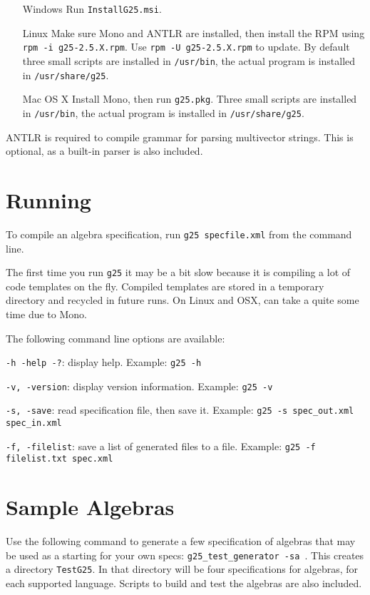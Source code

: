 \documentclass[10pt, a4paper]{article}
\begin{document}
\begin{itemize}
\item[Windows] Run {\tt InstallG25.msi}.
\item[Linux] Make sure Mono and ANTLR are installed, then install the RPM using 
{\tt rpm -i g25-2.5.X.rpm}. Use {\tt rpm -U g25-2.5.X.rpm} to update.
By default three small scripts are installed in {\tt /usr/bin}, the actual program is installed in {\tt /usr/share/g25}.
\item[Mac OS X] Install Mono, then run {\tt g25.pkg}. Three small scripts are installed in {\tt /usr/bin}, the actual 
program is installed in {\tt /usr/share/g25}.
\end{itemize}

ANTLR is required to compile grammar for parsing multivector strings.
This is optional, as a built-in parser is also included.

\section{Running}

To compile an algebra specification, run {\tt g25 specfile.xml} from the command line.
	
The first time you run {\tt g25} it may be a bit slow because it is compiling
a lot of code templates on the fly. Compiled templates are stored in a temporary 
directory and recycled in future runs.
On Linux and OSX, can take a quite some time due to Mono.

	
The following command line options are available:

{\tt -h -help -?}: display help.
Example: {\tt g25 -h}

{\tt -v, -version}: display version information.
Example: {\tt g25 -v}

{\tt -s, -save}: read specification file, then save it.
Example: {\tt g25 -s spec_out.xml spec_in.xml}

{\tt -f, -filelist}: save a list of generated files to a file.
Example: {\tt g25 -f filelist.txt spec.xml}

\section{Sample Algebras}

Use the following command to generate a few specification of algebras that may be used
as a starting for your own specs: {\tt g25_test_generator -sa }.
This creates a directory {\tt TestG25}. In that directory will be four specifications for
algebras, for each supported language. Scripts to build and test the algebras are also
included.
\end{document}
